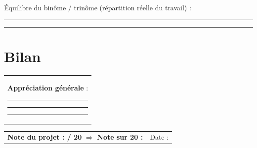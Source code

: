 \documentclass[10pt,a4paper]{article}
\begin{document}
\medskip
Équilibre du binôme / trinôme (répartition réelle du travail) :
\par\medskip\hrule\medskip\hrule\medskip

\section*{Bilan}
\begin{tabularx}{\linewidth}{@{}X@{}}
\textbf{Appréciation générale} :\par\medskip
\hrule\medskip\hrule\medskip\hrule\medskip
\end{tabularx}

\bigskip
\begin{tabularx}{\linewidth}{@{}X r@{}}
\textbf{Note du projet : \hspace{1.5cm} / 20} \quad $\Rightarrow$ \quad \textbf{Note sur 20 : \hspace{1.5cm}} & Date : \dotfill \\
\end{tabularx}
\end{document}
